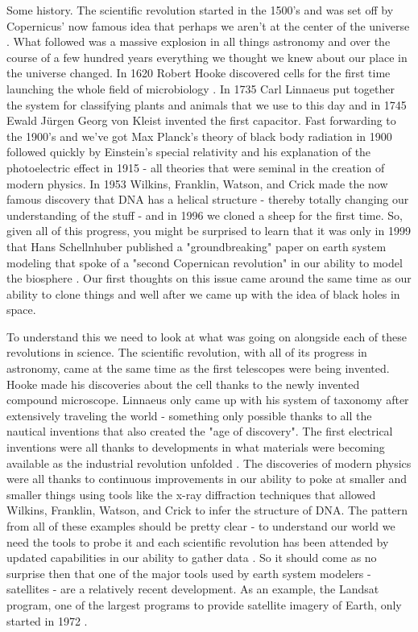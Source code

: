 \documentclass[11pt,a5paper]{book}
\begin{document}
Some history. The scientific revolution started in the 1500's and was set off by Copernicus' now famous idea that perhaps we aren't at the center of the universe \cite{sbrush}. What followed was a massive explosion in all things astronomy and over the course of a few hundred years everything we thought we knew about our place in the universe changed. In 1620 Robert Hooke discovered cells for the first time launching the whole field of microbiology \cite{wsd}. In 1735 Carl Linnaeus put together the system for classifying plants and animals that we use to this day and in 1745 Ewald Jürgen Georg von Kleist invented the first capacitor. Fast forwarding to the 1900's and we've got Max Planck's theory of black body radiation in 1900 followed quickly by Einstein's special relativity and his explanation of the photoelectric effect in 1915 - all theories that were seminal in the creation of modern physics. In 1953 Wilkins, Franklin, Watson, and Crick made the now famous discovery that DNA has a helical structure - thereby totally changing our understanding of the stuff - and in 1996 we cloned a sheep for the first time. So, given all of this progress, you might be surprised to learn that it was only in 1999 that Hans Schellnhuber published a "groundbreaking" paper on earth system modeling that spoke of a "second Copernican revolution" in our ability to model the biosphere \cite{hschellnhuber}. Our first thoughts on this issue came around the same time as our ability to clone things and well after we came up with the idea of black holes in space. 

To understand this we need to look at what was going on alongside each of these revolutions in science. The scientific revolution, with all of its progress in astronomy, came at the same time as the first telescopes were being invented. Hooke made his discoveries about the cell thanks to the newly invented compound microscope. Linnaeus only came up with his system of taxonomy after extensively traveling the world - something only possible thanks to all the nautical inventions that also created the "age of discovery". The first electrical inventions were all thanks to developments in what materials were becoming available as the industrial revolution unfolded \cite{tkuhn}. The discoveries of modern physics were all thanks to continuous improvements in our ability to poke at smaller and smaller things using tools like the x-ray diffraction techniques that allowed Wilkins, Franklin, Watson, and Crick to infer the structure of DNA. The pattern from all of these examples should be pretty clear - to understand our world we need the tools to probe it and each scientific revolution has been attended by updated capabilities in our ability to gather data \cite{tkuhn}. So it should come as no surprise then that one of the major tools used by earth system modelers - satellites - are a relatively recent development. As an example, the Landsat program, one of the largest programs to provide satellite imagery of Earth, only started in 1972 \cite{wls}.
\end{document}
